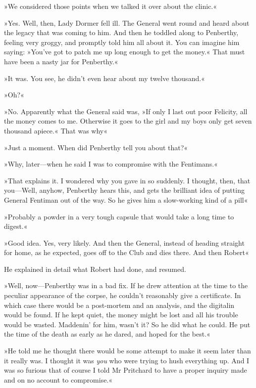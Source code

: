 »We considered those points when we talked it over about the clinic.«

»Yes. Well, then, Lady Dormer fell ill. The General went round and heard about the legacy that was coming to him. And then he toddled along to Penberthy, feeling very groggy, and promptly told him all about it. You can imagine him saying: »You've got to patch me up long enough to get the money.« That must have been a nasty jar for Penberthy.«

»It was. You see, he didn't even hear about my twelve thousand.«

»Oh?«

»No. Apparently what the General said was, »If only I last out poor Felicity, all the money comes to me. Otherwise it goes to the girl and my boys only get seven thousand apiece.« That was why\longdash«

»Just a moment. When did Penberthy tell you about that?«

»Why, later—when he said I was to compromise with the Fentimans.«

»That explains it. I wondered why you gave in so suddenly. I thought, then, that you—Well, anyhow, Penberthy hears this, and gets the brilliant idea of putting General Fentiman out of the way. So he gives him a slow-working kind of a pill\longdash«

»Probably a powder in a very tough capsule that would take a long time to digest.«

»Good idea. Yes, very likely. And then the General, instead of heading straight for home, as he expected, goes off to the Club and dies there. And then Robert\longdash«

He explained in detail what Robert had done, and resumed.

»Well, now—Penberthy was in a bad fix. If he drew attention at the time to the peculiar appearance of the corpse, he couldn't reasonably give a certificate. In which case there would be a post-mortem and an analysis, and the digitalin would be found. If he kept quiet, the money might be lost and all his trouble would be wasted. Maddenin' for him, wasn't it? So he did what he could. He put the time of the death as early as he dared, and hoped for the best.«

»He told me he thought there would be some attempt to make it seem later than it really was. I thought it was \textit{you} who were trying to hush everything up. And I was so furious that of course I told Mr Pritchard to have a proper inquiry made and on no account to compromise.«

